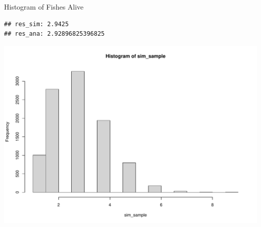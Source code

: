 \documentclass[
  10pt,
  ignorenonframetext,
  serif]{beamer}
\begin{document}
\begin{frame}[fragile]{Histogram of Fishes Alive}
\protect\hypertarget{histogram-of-fishes-alive}{}
\begin{verbatim}
## res_sim: 2.9425
## res_ana: 2.92896825396825
\end{verbatim}

\begin{center}\includegraphics{lec04_files/figure-beamer/unnamed-chunk-5-1} \end{center}
\end{frame}
\end{document}
